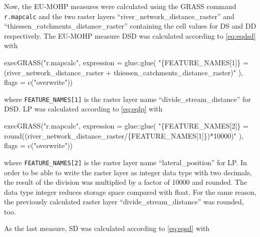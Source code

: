 \documentclass[fleqn,10pt]{wlscirep}
\newenvironment{Shaded}{\begin{snugshade}}{\end{snugshade}}
\newcommand{\AttributeTok}[1]{\textcolor[rgb]{0.77,0.63,0.00}{#1}}
\newcommand{\FunctionTok}[1]{\textcolor[rgb]{0.00,0.00,0.00}{#1}}
\newcommand{\NormalTok}[1]{#1}
\newcommand{\SpecialCharTok}[1]{\textcolor[rgb]{0.00,0.00,0.00}{#1}}
\newcommand{\StringTok}[1]{\textcolor[rgb]{0.31,0.60,0.02}{#1}}
\begin{document}
Now, the EU-MOHP measures were calculated using the GRASS command \texttt{r.mapcalc} and the two raster layers ``river\_network\_distance\_raster'' and ``thiessen\_catchments\_distance\_raster'' containing the cell values for DS and DD respectively. The EU-MOHP measure DSD was calculated according to \eqref{eq:eqdsd} with

\footnotesize

\begin{Shaded}
\begin{Highlighting}[]
\FunctionTok{execGRASS}\NormalTok{(}\StringTok{"r.mapcalc"}\NormalTok{,}
          \AttributeTok{expression =}\NormalTok{ glue}\SpecialCharTok{::}\FunctionTok{glue}\NormalTok{(}
            \StringTok{"\{FEATURE\_NAMES[1]\} = (river\_network\_distance\_raster + thiessen\_catchments\_distance\_raster)"}
\NormalTok{            ),}
          \AttributeTok{flags =} \FunctionTok{c}\NormalTok{(}\StringTok{"overwrite"}\NormalTok{))}
\end{Highlighting}
\end{Shaded}

\normalsize
\noindent
where \texttt{FEATURE\_NAMES{[}1{]}} is the raster layer name ``divide\_stream\_distance'' for DSD.
LP was calculated according to \eqref{eq:eqlp} with

\footnotesize

\begin{Shaded}
\begin{Highlighting}[]
\FunctionTok{execGRASS}\NormalTok{(}\StringTok{"r.mapcalc"}\NormalTok{,}
          \AttributeTok{expression =}\NormalTok{ glue}\SpecialCharTok{::}\FunctionTok{glue}\NormalTok{(}
            \StringTok{"\{FEATURE\_NAMES[2]\} = round((river\_network\_distance\_raster/\{FEATURE\_NAMES[1]\})*10000)"}
\NormalTok{            ),}
          \AttributeTok{flags =} \FunctionTok{c}\NormalTok{(}\StringTok{"overwrite"}\NormalTok{))}
\end{Highlighting}
\end{Shaded}

\normalsize
\noindent
where \texttt{FEATURE\_NAMES{[}2{]}} is the raster layer name ``lateral\_position'' for LP. In order to be able to write the raster layer as integer data type with two decimals, the result of the division was multiplied by a factor of 10000 and rounded. The data type integer reduces storage space compared with float. For the same reason, the previously calculated raster layer ``divide\_stream\_distance'' was rounded, too.

As the last measure, SD was calculated according to \eqref{eq:eqsd} with
\end{document}
